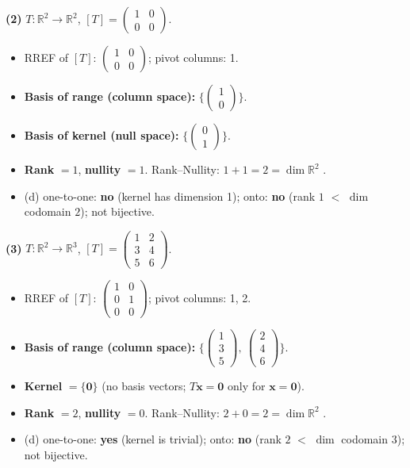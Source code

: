 \noindent\textbf{(2)} $T:\mathbb{R}^2\to\mathbb{R}^2$, $[T]=\begin{pmatrix}1 & 0 \\ 0 & 0\end{pmatrix}$.
\begin{itemize}
\item RREF of $[T]$: $\begin{pmatrix}1 & 0 \\ 0 & 0\end{pmatrix}$; pivot columns: 1.
\item \textbf{Basis of range (column space):} $\Big\{\begin{pmatrix}1 \\ 0\end{pmatrix}\Big\}$.
\item \textbf{Basis of kernel (null space):} $\Big\{\begin{pmatrix}0 \\ 1\end{pmatrix}\Big\}$.
\item \textbf{Rank} $=1$, \textbf{nullity} $=1$. Rank--Nullity: $1+1=2=\dim\mathbb{R}^2$ \checkmark.
\item (d) one-to-one: \textbf{no} (kernel has dimension 1); onto: \textbf{no} (rank $1$ $<$ $\dim$ codomain $2$); not bijective.
\end{itemize}

\noindent\textbf{(3)} $T:\mathbb{R}^2\to\mathbb{R}^3$, $[T]=\begin{pmatrix}1 & 2 \\ 3 & 4 \\ 5 & 6\end{pmatrix}$.
\begin{itemize}
\item RREF of $[T]$: $\begin{pmatrix}1 & 0 \\ 0 & 1 \\ 0 & 0\end{pmatrix}$; pivot columns: 1, 2.
\item \textbf{Basis of range (column space):} $\Big\{\begin{pmatrix}1 \\ 3 \\ 5\end{pmatrix},\ \begin{pmatrix}2 \\ 4 \\ 6\end{pmatrix}\Big\}$.
\item \textbf{Kernel} $=\{\mathbf 0\}$ (no basis vectors; $T\mathbf x=\mathbf0$ only for $\mathbf x=\mathbf 0$).
\item \textbf{Rank} $=2$, \textbf{nullity} $=0$. Rank--Nullity: $2+0=2=\dim\mathbb{R}^2$ \checkmark.
\item (d) one-to-one: \textbf{yes} (kernel is trivial); onto: \textbf{no} (rank $2$ $<$ $\dim$ codomain $3$); not bijective.
\end{itemize}

